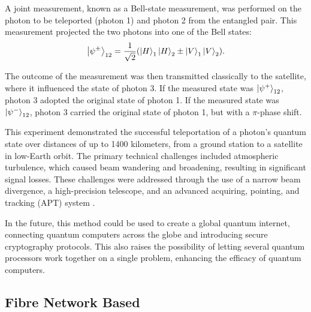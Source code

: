 A joint measurement, known as a Bell-state measurement, was performed on the photon to be teleported (photon 1) and photon 2 from the entangled pair. 
This measurement projected the two photons into one of the Bell states:
\begin{equation}
    \ket{\psi^{\pm}}_{12} = \frac{1}{\sqrt{2}} (\ket{H}_1\ket{H}_2 \pm \ket{V}_1\ket{V}_2).
\end{equation}

The outcome of the measurement was then transmitted classically to the satellite, where it influenced the state of photon 3. If the measured state was \(\ket{\psi^{+}}_{12}\), photon 3 adopted the original state of photon 1. If the measured state was \(\ket{\psi^{-}}_{12}\), photon 3 carried the original state of photon 1, but with a \(\pi\)-phase shift.  

This experiment demonstrated the successful teleportation of a photon's quantum state over distances of up to 1400 kilometers, from a ground station to a satellite in low-Earth orbit. 
The primary technical challenges included atmospheric turbulence, which caused beam wandering and broadening, resulting in significant signal losses. 
These challenges were addressed through the use of a narrow beam divergence, a high-precision telescope, and an advanced acquiring, pointing, and tracking (APT) system \cite{Ren:2017}.

In the future, this method could be used to create a global quantum internet, connecting quantum computers across the globe and introducing secure cryptography protocols. 
This also raises the possibility of letting several quantum processors work together on a single problem, enhancing the efficacy of quantum computers.

\subsection{Fibre Network Based}


